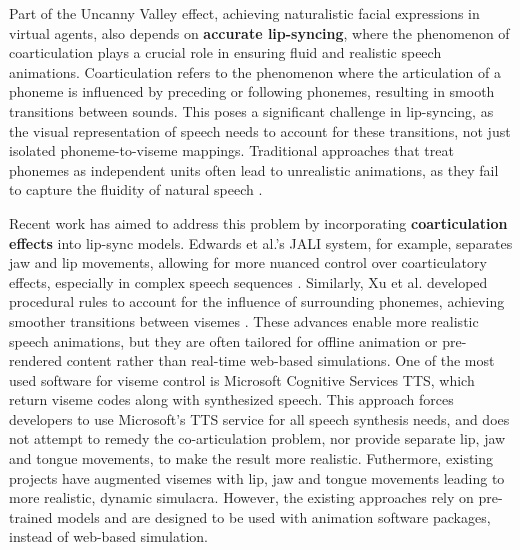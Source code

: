 \documentclass[12pt]{article}
\begin{document}
Part of the Uncanny Valley effect, achieving naturalistic facial expressions in virtual agents, also depends on {\bf accurate lip-syncing}, where the phenomenon of coarticulation plays a crucial role in ensuring fluid and realistic speech animations. Coarticulation refers to the phenomenon where the articulation of a phoneme is influenced by preceding or following phonemes, resulting in smooth transitions between sounds. This poses a significant challenge in lip-syncing, as the visual representation of speech needs to account for these transitions, not just isolated phoneme-to-viseme mappings. Traditional approaches that treat phonemes as independent units often lead to unrealistic animations, as they fail to capture the fluidity of natural speech \cite{Edwards2016}.

Recent work has aimed to address this problem by incorporating {\bf coarticulation effects} into lip-sync models. Edwards et al.’s JALI system, for example, separates jaw and lip movements, allowing for more nuanced control over coarticulatory effects, especially in complex speech sequences \cite{Edwards2016}. Similarly, Xu et al. \cite{Xu2013AGames} developed procedural rules to account for the influence of surrounding phonemes, achieving smoother transitions between visemes . These advances enable more realistic speech animations, but they are often tailored for offline animation or pre-rendered content rather than real-time web-based simulations.
One of the most used software for viseme control is Microsoft Cognitive Services TTS, which return viseme codes along with synthesized speech. This approach forces developers to use Microsoft's TTS service for all speech synthesis needs, and does not attempt to remedy the co-articulation problem, nor provide separate lip, jaw and tongue movements, to make the result more realistic.  Futhermore, existing projects have augmented visemes with lip, jaw and tongue movements leading to  more realistic, dynamic simulacra. However, the existing approaches rely on pre-trained models and are designed to be used with animation software packages, instead of web-based simulation.  
\end{document}
